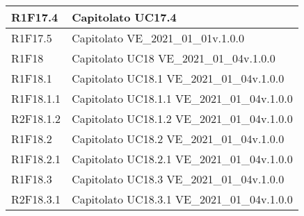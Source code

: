 \begin{center}
\begin{longtable}{|p{22mm}|p{44mm}|}
R1F17.4 &
Capitolato \newline
UC17.4 \newline
\\
\hline

R1F17.5 &
Capitolato \newline
VE\_2021\_01\_01v.1.0.0 \newline
\\
\hline

R1F18 &
Capitolato \newline
UC18 \newline
VE\_2021\_01\_04v.1.0.0 \newline
\\
\hline

R1F18.1 &
Capitolato \newline
UC18.1 \newline
VE\_2021\_01\_04v.1.0.0 \newline
\\
\hline

R1F18.1.1 &
Capitolato \newline
UC18.1.1 \newline
VE\_2021\_01\_04v.1.0.0 \newline
\\
\hline

R2F18.1.2 &
Capitolato \newline
UC18.1.2 \newline
VE\_2021\_01\_04v.1.0.0 \newline
\\
\hline

R1F18.2 &
Capitolato \newline
UC18.2 \newline
VE\_2021\_01\_04v.1.0.0 \newline
\\
\hline

R1F18.2.1 &
Capitolato \newline
UC18.2.1 \newline
VE\_2021\_01\_04v.1.0.0 \newline
\\
\hline

R1F18.3 &
Capitolato \newline
UC18.3 \newline
VE\_2021\_01\_04v.1.0.0 \newline
\\
\hline

R2F18.3.1 &
Capitolato \newline
UC18.3.1 \newline
VE\_2021\_01\_04v.1.0.0 \newline
\\
\hline


\end{longtable}
\end{center}
